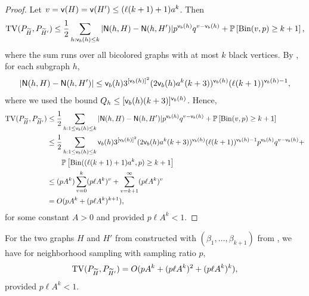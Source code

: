 \begin{proof}
Let $ v = {\mathsf{v}}(H) = {\mathsf{v}}(H') \leq (\ell(k+1)+1)a^k $. Then
\begin{align*}
{\rm TV}(P_{{\widetilde{H}}}, P_{{\widetilde{H}}'}) \leq \frac{1}{2}\sum_{h:{\mathsf{v}}_{b}(h)\leq k}| {\mathsf{N}}(h, H) - {\mathsf{N}}(h, H')|p^{{\mathsf{v}}_{b}(h)}q^{v-{\mathsf{v}}_{b}(h)} + \mathbb{P}\left[\mathrm{Bin}(v, p) \geq k+1\right],
\end{align*}
where the sum runs over all bicolored graphs with at most $ k $ black vertices. By , for each subgraph $ h $,
\begin{equation*}
|{\mathsf{N}}(h, H)-{\mathsf{N}}(h, H')|  \leq {\mathsf{v}}_{b}(h)3^{[{\mathsf{v}}_{b}(h)]^2}(2{\mathsf{v}}_{b}(h)a^k(k+3))^{{\mathsf{v}}_{b}(h)}(\ell(k+1))^{{\mathsf{v}}_{b}(h)-1},
\end{equation*}
where we used the bound $ Q_h \leq [{\mathsf{v}}_{b}(h)(k+3)]^{{\mathsf{v}}_{b}(h)} $.
Hence,
\begin{align*}
{\rm TV}(P_{{\widetilde{H}}}, P_{{\widetilde{H}}'}) & \leq \frac{1}{2}\sum_{h:1 \leq {\mathsf{v}}_{b}(h)\leq k}| {\mathsf{N}}(h, H) - {\mathsf{N}}(h, H')|p^{{\mathsf{v}}_{b}(h)}q^{v-{\mathsf{v}}_{b}(h)} + \mathbb{P}\left[\mathrm{Bin}(v, p) \geq k+1\right] \\
& \leq \frac{1}{2}\sum_{h:1 \leq {\mathsf{v}}_{b}(h)\leq k}{\mathsf{v}}_{b}(h)3^{[{\mathsf{v}}_{b}(h)]^2}(2{\mathsf{v}}_{b}(h)a^k(k+3))^{{\mathsf{v}}_{b}(h)}(\ell(k+1))^{{\mathsf{v}}_{b}(h)-1}p^{{\mathsf{v}}_{b}(h)}q^{v-{\mathsf{v}}_{b}(h)}  + \\ & \qquad \mathbb{P}\left[\mathrm{Bin}((\ell(k+1)+1)a^k, p) \geq k+1\right] \\
& \leq (pA^k) \sum_{v=0}^k (p\ell A^k)^{v} + \sum_{v=k+1}^{\infty} (p\ell A^k)^{v} \\
& = O(pA^k  + (p\ell A^k)^{k+1}),
\end{align*}
for some constant $ A > 0 $ and provided $ p\ell A^k < 1 $.
\end{proof}

\begin{lemma} \label{lmm:tv-broken-forest}
For the two graphs $ H $ and $ H' $ from  constructed with $(\beta_1, \dots, \beta_{k+1})$ from , we have for neighborhood sampling with sampling ratio $ p $,
\begin{equation*}
{\rm TV}(P_{{\widetilde{H}}}, P_{{\widetilde{H}}'}) = O(pA^k + (p\ell A^k)^2 + (p\ell A^k)^{k}),
\end{equation*}
provided $ p\ell A^k < 1 $.
\end{lemma}

